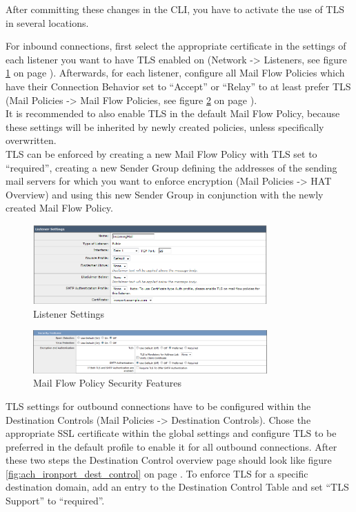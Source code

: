 After committing these changes in the CLI, you have to activate the use of TLS in several locations. 

For inbound connections, first select the appropriate certificate in the settings of each listener you want to have TLS enabled on (Network -> Listeners, see figure \ref{fig:ach_ironport_listener_cert} on page \pageref{fig:ach_ironport_listener_cert}). Afterwards, for each listener, configure all Mail Flow Policies which have their Connection Behavior set to ``Accept'' or ``Relay'' to at least prefer TLS (Mail Policies -> Mail Flow Policies, see figure \ref{fig:ach_ironport_mail_flow_tls} on page \pageref{fig:ach_ironport_mail_flow_tls}). \\
It is recommended to also enable TLS in the default Mail Flow Policy, because these settings will be inherited by newly created policies, unless specifically overwritten. \\
TLS can be enforced by creating a new Mail Flow Policy with TLS set to ``required'', creating a new Sender Group defining the addresses of the sending mail servers for which you want to enforce encryption (Mail Policies -> HAT Overview) and using this new Sender Group in conjunction with the newly created Mail Flow Policy. 

\begin{figure}[p]
  \centering
  \includegraphics[width=0.8\textwidth]{img/ach_ironport_listener_cert.png}
  \caption{Listener Settings}
  \label{fig:ach_ironport_listener_cert}
\end{figure}

\begin{figure}[p]
  \centering
  \includegraphics[width=0.8\textwidth]{img/ach_ironport_mail_flow_tls.png}
  \caption{Mail Flow Policy Security Features}
  \label{fig:ach_ironport_mail_flow_tls}
\end{figure}

TLS settings for outbound connections have to be configured within the Destination Controls (Mail Policies -> Destination Controls). Chose the appropriate SSL certificate within the global settings and configure TLS to be preferred in the default profile to enable it for all outbound connections. After these two steps the Destination Control overview page should look like figure \ref{fig:ach_ironport_dest_control} on page \pageref{fig:ach_ironport_dest_control}. 
To enforce TLS for a specific destination domain, add an entry to the Destination Control Table and set ``TLS Support'' to ``required''.

